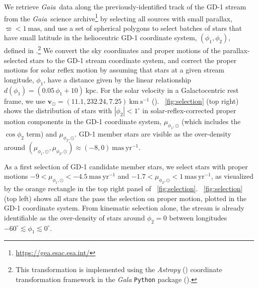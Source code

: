 \documentclass[modern]{aastex62}
\newcommand{\package}[1]{\textsl{#1}}
\newcommand{\gaia}{\textsl{Gaia}}
\newcommand{\kms}{\ensuremath{\textrm{km}~\textrm{s}^{-1}}}
\newcommand{\bs}[1]{\boldsymbol{#1}}
\newcommand{\masyr}{\ensuremath{\textrm{mas}~\textrm{yr}^{-1}}}
\begin{document}
We retrieve \gaia\ data along the previously-identified track of the GD-1 stream
from the \gaia\ science archive\footnote{\url{https://gea.esac.esa.int/}} by
selecting all sources with small parallax, $\varpi < 1~\textrm{mas}$, and use a
set of spherical polygons to select batches of stars that have small latitude in
the heliocentric GD-1 coordinate system, $(\phi_1, \phi_2)$, defined in
\cite{Koposov:2010}.\footnote{This transformation is implemented using the
\package{Astropy} (\citealt{astropy}) coordinate transformation framework in the
\package{Gala} \texttt{Python} package (\citealt{gala}).}
We convert the sky coordinates and proper motions of the parallax-selected stars
to the GD-1 stream coordinate system, and correct the proper motions for solar
reflex motion by assuming that stars at a given stream longitude, $\phi_1$, have
a distance given by the linear relationship $d(\phi_1) = (0.05 \, \phi_1 +
10)~\textrm{kpc}$.
For the solar velocity in a Galactocentric rest frame, we use $\bs{v}_\odot =
(11.1, 232.24, 7.25)~\kms$ (\citealt{Schonrich:2010, Bovy:2015}).
\figurename~\ref{fig:selection} (top right) shows the distribution of stars with
$|\phi_2| < 1^\circ$ in solar-reflex-corrected proper motion components in the
GD-1 coordinate system, $\mu_{\phi_1, \odot}$ (which includes the $\cos{\phi_2}$
term) and $\mu_{\phi_2, \odot}$.
GD-1 member stars are visible as the over-density around
$(\mu_{\phi_1, \odot}, \mu_{\phi_2, \odot}) \approx (-8, 0)~\masyr$.

As a first selection of GD-1 candidate member stars, we select stars with proper
motions $-9 < \mu_{\phi_1, \odot} < -4.5~\masyr$ and $-1.7 < \mu_{\phi_2, \odot}
< 1~\masyr$, as visualized by the orange rectangle in the top right panel of
\figurename~\ref{fig:selection}.
\figurename~\ref{fig:selection} (top left) shows all stars the pass the
selection on proper motion, plotted in the GD-1 coordinate system.
From kinematic selection alone, the stream is already identifiable as the over-density
of stars around $\phi_2 = 0$ between longitudes $-60^\circ \lesssim \phi_1
\lesssim 0^\circ$.
\end{document}
